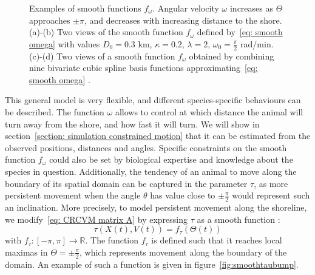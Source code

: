 \documentclass[11pt]{article}
\newcommand {\R}{\mathbb{R}}
\newcommand {\1}{\mathbb{1}}
\theoremstyle{definition}
\theoremstyle{remark}
\theoremstyle{remark}
\begin{document}
\begin{figure}[H]
\begin{subfigure}{0.48\textwidth}
	\caption{}
	\label{fig: smoothomegasplines2}
	\end{subfigure}
	\caption{Examples of smooth functions $f_{\omega}$. Angular velocity $\omega$ increases as $\Theta$ approaches $\pm\pi$, and decreases with increasing distance to the shore.  (a)-(b) Two views of the smooth function $f_{\omega}$ defined by~\eqref{eq: smooth omega} with values $D_0=0.3$ km, $\kappa=0.2$, $\lambda=2$, $\omega_0=\frac{\pi}{2}$ rad/min. (c)-(d) Two views of a smooth function $f_{\omega}$ obtained by combining nine bivariate cubic spline basis functions approximating~\eqref{eq: smooth omega} .}
	
\end{figure}

 This general model is very flexible, and different species-specific behaviours can be described. The function $\omega$ allows to control at which distance the animal will turn away from the shore, and how fast it will turn. We will show in section~\ref{section: simulation constrained motion} that it can be estimated from the observed positions, distances and angles. Specific constraints on the smooth function $f_{\omega}$ could also be set by biological expertise and knowledge about the species in question. Additionally, the tendency of an animal to move along the boundary of its spatial domain can be captured in the parameter $\tau$, as more persistent movement when the angle $\theta$ has value close to $\pm\frac{\pi}{2}$ would represent such an inclination. More precisely, to model persistent movement along the shoreline, we modify~\eqref{eq: CRCVM matrix A} by expressing $\tau$ as a smooth function :
 \[\tau(X(t),V(t))=f_{\tau}(\Theta(t))\] with $f_{\tau}:[-\pi,\pi] \longrightarrow \R$.
 The function $f_{\tau}$ is defined such that it reaches local maximas in $\Theta=\pm\frac{\pi}{2}$, which represents movement along the boundary of the domain. An example of such a function is given in figure~\ref{fig:smoothtaubump}.
\end{document}
